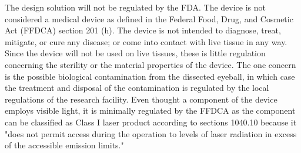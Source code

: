\documentclass{article}
\begin{document}
The design solution will not be regulated by the FDA. The device is
not considered a medical device as defined in the Federal Food, Drug,
and Cosmetic Act (FFDCA) section 201 (h). The device is not intended
to diagnose, treat, mitigate, or cure any disease; or come into
contact with live tissue in any way. Since the device will not be used
on live tissues, these is little regulation concerning the sterility
or the material properties of the device. The one concern is the
possible biological contamination from the dissected eyeball, in which
case the treatment and disposal of the contamination is regulated by
the local regulations of the research facility.  Even thought a
component of the device employs visible light, it is minimally
regulated by the FFDCA as the component can be classified as Class I
laser product according to sections 1040.10 because it "does not
permit access during the operation to levels of laser radiation in
excess of the accessible emission limits."




\newpage
{}


\end{document}
